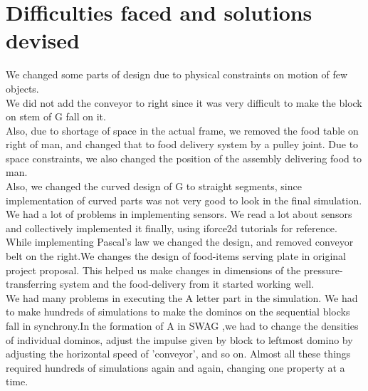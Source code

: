 \documentclass{report}
\begin{document}
\section{Difficulties faced and solutions devised}
We changed some parts of design due to physical constraints on motion of few objects.\\
We did not add the conveyor to right since it was very difficult to make the block on stem of G fall on it.\\
Also, due to shortage of space in the actual frame, we removed the food table on right of man, and changed that to food delivery system by a pulley joint.
Due to space constraints, we also changed the position of the assembly delivering food to man.\\
Also, we changed the curved design of G to straight segments, since implementation of curved parts was not very good to look in 
the final simulation.\\
We had a lot of problems in implementing sensors. We read a lot about sensors and collectively implemented it finally, using iforce2d tutorials for reference.
\\
While implementing Pascal's law we changed the design, and removed conveyor belt on the right.We changes the design of food-items 
serving plate in original project proposal. This helped us make changes in dimensions of the pressure-transferring system and the food-delivery from it started working well.\\
We had many problems in executing the A letter part in the simulation. We had to make hundreds of simulations to make the dominos on the 
sequential blocks fall in synchrony.In the formation of A in SWAG ,we had to change the densities of individual dominos, adjust the impulse given by block to leftmost domino by adjusting the horizontal speed of 'conveyor', and so on. Almost all these things required hundreds of simulations again and again,
changing one property at a time.\\
\newpage
\end{document}
